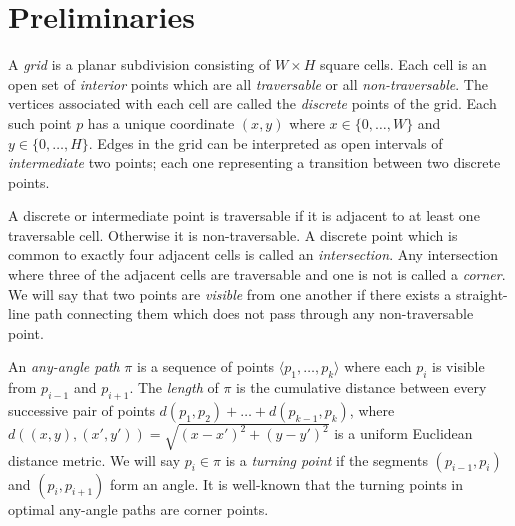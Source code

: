 \section{Preliminaries}
A \emph{grid} is a planar subdivision consisting of $W \times H$ square cells.
Each cell is an open set of \emph{interior} points which are 
all \emph{traversable} or all \emph{non-traversable}.
The vertices associated with each cell are called the
\emph{discrete} points of the grid. Each such point $p$ has a unique coordinate $(x, y)$
where $x \in \{0,\dots,W\}$ and $y \in \{0,\dots,H\}$.
Edges in the grid can be interpreted as open intervals of \emph{intermediate}
two points; each one representing a transition between two discrete points. 
\par
A discrete or intermediate point is traversable if it is adjacent to 
at least one traversable cell. Otherwise it is non-traversable.
A discrete point which is common to exactly four adjacent cells is called an \emph{intersection}.
Any intersection where three of the adjacent cells are traversable and one is not
is called a \emph{corner}.
We will say that two points are \emph{visible} from one another if there exists a 
straight-line path connecting them which does not pass through any non-traversable point.

An \emph{any-angle path} $\pi$ is a sequence of points 
$\langle p_1,\dots,p_k \rangle$ where each $p_{i}$ is visible from $p_{i-1}$
and $p_{i+1}$.
The \emph{length} of $\pi$ 
is the cumulative distance between every successive
pair of points $d(p_1,p_2) + \dots + d(p_{k-1},p_k)$, 
where $d((x,y), (x',y'))= \sqrt{(x-x')^2 + (y-y')^2}$ 
is a uniform Euclidean distance metric.
We will say $p_i \in \pi$ is a \emph{turning point} if the segments
$(p_{i-1}, p_i)$ and $(p_i, p_{i+1})$ form an angle.
It is well-known that the turning points in optimal any-angle paths 
are corner points.  

